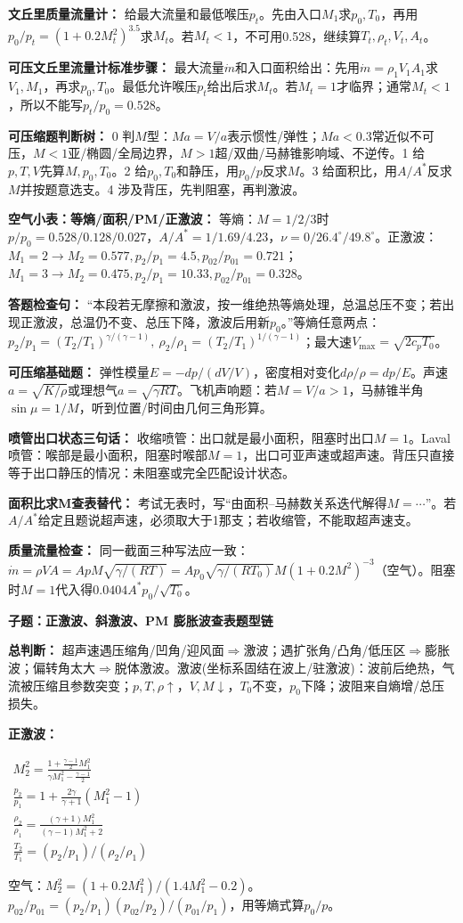 \documentclass[a4paper]{article}
\newcommand{\qt}[1]{\vspace{0.10pt}\colorbox{Q}{\parbox{\dimexpr\linewidth-2\fboxsep}{\color{white}\bfseries #1}}\par}
\newcommand{\ans}[1]{\colorbox{G}{\parbox{\dimexpr\linewidth-2\fboxsep}{#1}}\par}
\newcommand{\sect}[1]{\par{\bfseries\color{Q}#1：}}
\newcommand{\fmlb}[1]{\ans{\begin{adjustbox}{max width=.96\linewidth}$\displaystyle #1$\end{adjustbox}}}
\newcommand{\schemeshock}{}
\begin{document}
\begin{multicols}{3}
{\sect{文丘里质量流量计}
给最大流量和最低喉压$p_t$。先由入口$M_1$求$p_0,T_0$，再用$p_0/p_t=(1+0.2M_t^2)^{3.5}$求$M_t$。若$M_t<1$，不可用0.528，继续算$T_t,\rho_t,V_t,A_t$。
\sect{可压文丘里流量计标准步骤}
最大流量$\dot m$和入口面积给出：先用$\dot m=\rho_1V_1A_1$求$V_1,M_1$，再求$p_0,T_0$。最低允许喉压$p_t$给出后求$M_t$。若$M_t=1$才临界；通常$M_t<1$，所以不能写$p_t/p_0=0.528$。
\sect{可压缩题判断树}
0 判$M$型：$Ma=V/a$表示惯性/弹性；$Ma<0.3$常近似不可压，$M<1$亚/椭圆/全局边界，$M>1$超/双曲/马赫锥影响域、不逆传。1 给$p,T,V$先算$M,p_0,T_0$。2 给$p_0,T_0$和静压，用$p_0/p$反求$M$。3 给面积比，用$A/A^*$反求$M$并按题意选支。4 涉及背压，先判阻塞，再判激波。
\sect{空气小表：等熵/面积/PM/正激波}
等熵：$M=1/2/3$时$p/p_0=0.528/0.128/0.027$，$A/A^*=1/1.69/4.23$，$\nu=0/26.4^\circ/49.8^\circ$。正激波：$M_1=2\to M_2=0.577,p_2/p_1=4.5,p_{02}/p_{01}=0.721$；$M_1=3\to M_2=0.475,p_2/p_1=10.33,p_{02}/p_{01}=0.328$。
\sect{答题检查句}
“本段若无摩擦和激波，按一维绝热等熵处理，总温总压不变；若出现正激波，总温仍不变、总压下降，激波后用新$p_0$。”等熵任意两点：$p_2/p_1=(T_2/T_1)^{\gamma/(\gamma-1)},\ \rho_2/\rho_1=(T_2/T_1)^{1/(\gamma-1)}$；最大速$V_{\max}=\sqrt{2c_pT_0}$。
\sect{可压缩基础题}
弹性模量$E=-dp/(dV/V)$，密度相对变化$d\rho/\rho=dp/E$。声速$a=\sqrt{K/\rho}$或理想气$a=\sqrt{\gamma RT}$。飞机声响题：若$M=V/a>1$，马赫锥半角$\sin\mu=1/M$，听到位置/时间由几何三角形算。
\sect{喷管出口状态三句话}
收缩喷管：出口就是最小面积，阻塞时出口$M=1$。Laval喷管：喉部是最小面积，阻塞时喉部$M=1$，出口可亚声速或超声速。背压只直接等于出口静压的情况：未阻塞或完全匹配设计状态。
\sect{面积比求M查表替代}
考试无表时，写“由面积--马赫数关系迭代解得$M=\cdots$”。若$A/A^*$给定且题说超声速，必须取大于1那支；若收缩管，不能取超声速支。
\sect{质量流量检查}
同一截面三种写法应一致：$\dot m=\rho VA=ApM\sqrt{\gamma/(RT)}=A p_0\sqrt{\gamma/(RT_0)}M(1+0.2M^2)^{-3}$（空气）。阻塞时$M=1$代入得$0.0404A^*p_0/\sqrt{T_0}$。
}

\qt{子题：正激波、斜激波、PM 膨胀波查表题型链}
{\fontsize{2.66}{2.82}\selectfont
\schemeshock
\sect{总判断}
超声速遇压缩角/凹角/迎风面$\Rightarrow$激波；遇扩张角/凸角/低压区$\Rightarrow$膨胀波；偏转角太大$\Rightarrow$脱体激波。激波(坐标系固结在波上/驻激波)：波前后绝热，气流被压缩且参数突变；$p,T,\rho\uparrow$，$V,M\downarrow$，$T_0$不变，$p_0$下降；波阻来自熵增/总压损失。

\sect{正激波}
\fmlb{\begin{gathered}
M_2^2=\frac{1+\frac{\gamma-1}{2}M_1^2}{\gamma M_1^2-\frac{\gamma-1}{2}}\\
\frac{p_2}{p_1}=1+\frac{2\gamma}{\gamma+1}(M_1^2-1)\\
\frac{\rho_2}{\rho_1}=\frac{(\gamma+1)M_1^2}{(\gamma-1)M_1^2+2}\\
\frac{T_2}{T_1}=(p_2/p_1)/(\rho_2/\rho_1)
\end{gathered}}
空气：$M_2^2=(1+0.2M_1^2)/(1.4M_1^2-0.2)$。\\
$p_{02}/p_{01}=(p_2/p_1)(p_{02}/p_2)/(p_{01}/p_1)$，用等熵式算$p_0/p$。

}
\end{multicols}
\end{document}
